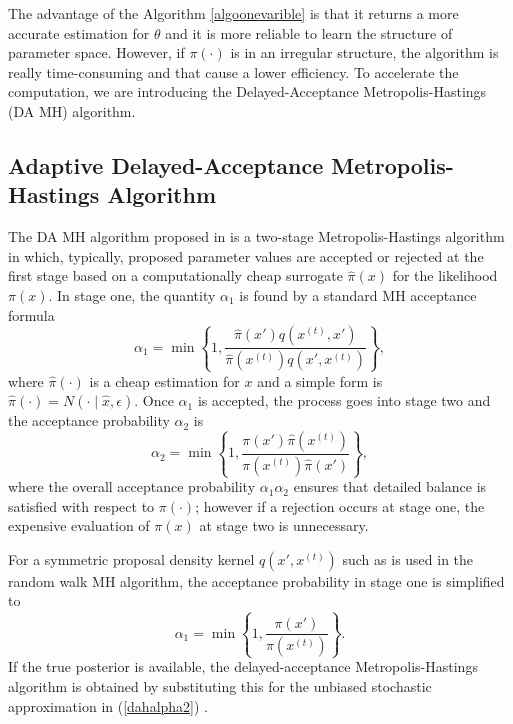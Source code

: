 The advantage of the Algorithm \ref{algoonevarible} is that it returns a more accurate estimation for $\theta$ and it is more reliable to learn the structure of parameter space. However, if $\pi(\cdot)$ is in an irregular structure, the algorithm is really time-consuming and that cause a lower efficiency. To accelerate the computation, we are introducing the Delayed-Acceptance Metropolis-Hastings (DA MH) algorithm.





\subsection{Adaptive Delayed-Acceptance Metropolis-Hastings Algorithm}

The DA MH algorithm proposed in \citep{christen2005markov} is a two-stage Metropolis-Hastings algorithm in which, typically, proposed parameter values are accepted or rejected at the first stage based on a computationally cheap surrogate $\hat{\pi}(x)$ for the likelihood $\pi(x)$. In stage one, the quantity $\alpha_1$ is found by a standard MH acceptance formula 
\begin{equation*}
\alpha_1=\min\left\lbrace  1,\frac{\hat{\pi}(x')q\left(x^{(t)}, x'\right)}{\hat{\pi}(x^{(t)})q\left(x', x^{(t)}\right)}  \right\rbrace ,
\end{equation*}
where $\hat{\pi}(\cdot)$ is a cheap estimation for $x$ and a simple form is $\hat{\pi}(\cdot)=N\left(\cdot\mid \hat{x},\epsilon\right)$. Once $\alpha_1$ is accepted, the process goes into stage two and the acceptance probability $\alpha_2$ is
\begin{equation}\label{dahalpha2}
\alpha_2=\min \left\lbrace  1,\frac{\pi(x')\hat{\pi}\left(x^{(t)}\right) }{\pi\left(x^{(t)}\right)\hat{\pi}(x')} \right\rbrace,
\end{equation}
where the overall acceptance probability $\alpha_1\alpha_2$ ensures that detailed balance is satisfied with respect to $\pi(\cdot)$; however if a rejection occurs at stage one, the expensive evaluation of $\pi(x)$ at stage two is unnecessary.

For a symmetric proposal density kernel $q\left(x', x^{(t)}\right)$ such as is used in the random walk MH algorithm, the acceptance probability in stage one is simplified to
\begin{equation} \label{dahalpha1}
\alpha_1= \min \left\lbrace 1,\frac{\pi(x')}{\pi\left(x^{(t)}\right)}  \right\rbrace.
\end{equation}
If the true posterior is available, the delayed-acceptance Metropolis-Hastings algorithm is obtained by substituting this for the unbiased stochastic approximation in (\ref{dahalpha2}) \citep{sherlock2015efficiency}.


